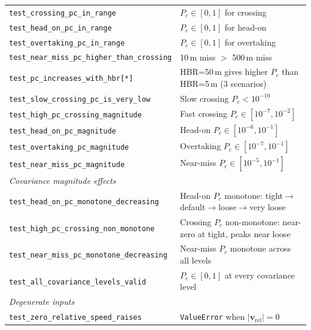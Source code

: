 \documentclass[11pt]{article}
\begin{document}
\begin{table}[htb]
\begin{tabular}{lp{10cm}}
  \texttt{test\_crossing\_pc\_in\_range} & $P_c \in [0, 1]$ for crossing \\
  \texttt{test\_head\_on\_pc\_in\_range} & $P_c \in [0, 1]$ for head-on \\
  \texttt{test\_overtaking\_pc\_in\_range} & $P_c \in [0, 1]$ for overtaking \\
  \texttt{test\_near\_miss\_pc\_higher\_than\_crossing} & 10\,m miss $>$ 500\,m miss \\
  \texttt{test\_pc\_increases\_with\_hbr[*]} & HBR=50\,m gives higher $P_c$ than HBR=5\,m (3 scenarios) \\
  \texttt{test\_slow\_crossing\_pc\_is\_very\_low} & Slow crossing $P_c < 10^{-10}$ \\
  \texttt{test\_high\_pc\_crossing\_magnitude} & Fast crossing $P_c \in [10^{-7}, 10^{-2}]$ \\
  \texttt{test\_head\_on\_pc\_magnitude} & Head-on $P_c \in [10^{-6}, 10^{-1}]$ \\
  \texttt{test\_overtaking\_pc\_magnitude} & Overtaking $P_c \in [10^{-7}, 10^{-1}]$ \\
  \texttt{test\_near\_miss\_pc\_magnitude} & Near-miss $P_c \in [10^{-5}, 10^{-1}]$ \\
  \midrule
  \multicolumn{2}{l}{\textit{Covariance magnitude effects}} \\
  \texttt{test\_head\_on\_pc\_monotone\_decreasing} & Head-on $P_c$ monotone: tight$\to$default$\to$loose$\to$very loose \\
  \texttt{test\_high\_pc\_crossing\_non\_monotone} & Crossing $P_c$ non-monotone: near-zero at tight, peaks near loose \\
  \texttt{test\_near\_miss\_pc\_monotone\_decreasing} & Near-miss $P_c$ monotone across all levels \\
  \texttt{test\_all\_covariance\_levels\_valid} & $P_c \in [0, 1]$ at every covariance level \\
  \midrule
  \multicolumn{2}{l}{\textit{Degenerate inputs}} \\
  \texttt{test\_zero\_relative\_speed\_raises} & \texttt{ValueError} when $|\mathbf{v}_\text{rel}| = 0$ \\
  \bottomrule
\end{tabular}
\end{table}
\end{document}
